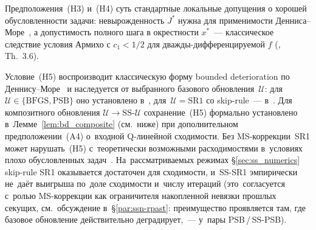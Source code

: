 \begin{remark}\label{rem:ss_dm_assumptions}
Предположения~(H3) и~(H4) суть стандартные локальные допущения о хорошей
обусловленности задачи: невырожденность $J^*$ нужна для применимости
Денниса--Море~\cite{dennis1974}, а допустимость полного шага в окрестности
$x^*$~--- классическое следствие условия Армихо с $c_1 < 1/2$ для
дважды-дифференцируемой $f$ (\cite{bfgs}, Th.~3.6).

Условие~(H5) воспроизводит классическую форму bounded deterioration по
Деннису–Море~\cite{dennis1974} и наследуется от выбранного
базового обновления~$\mathcal{U}$: для $\mathcal{U}\in\{\mathrm{BFGS},
\mathrm{PSB}\}$ оно установлено в~\cite{bfgs},
для~$\mathcal{U}=\mathrm{SR1}$ со skip-rule~--- в~\cite{conn1991}.
Для композитного обновления $\mathcal{U}\to\mathrm{SS}\text{-}\mathcal{U}$
сохранение~(H5) формально установлено в~Лемме~\ref{lem:bd_composite}
(см.\ ниже) при дополнительном предположении~(A4) о~входной
Q-линейной сходимости. Без MS-коррекции~SR1 может нарушать~(H5)
с~теоретически возможными расходимостями в~условиях
плохо обусловленных задач~\cite{conn1991}.
На~рассматриваемых режимах §\ref{sec:ss_numerics} skip-rule SR1
оказывается достаточен для сходимости, и~SS-SR1 эмпирически
не~даёт выигрыша по~доле сходимости и~числу итераций (это~согласуется
с~ролью MS-коррекции как ограничителя накопленной невязки прошлых
секущих, см.\ обсуждение в~§\ref{par:ssn-rpast}: преимущество
проявляется там, где базовое обновление действительно деградирует,~---
у~пары PSB\,/\,SS-PSB).
\end{remark}


